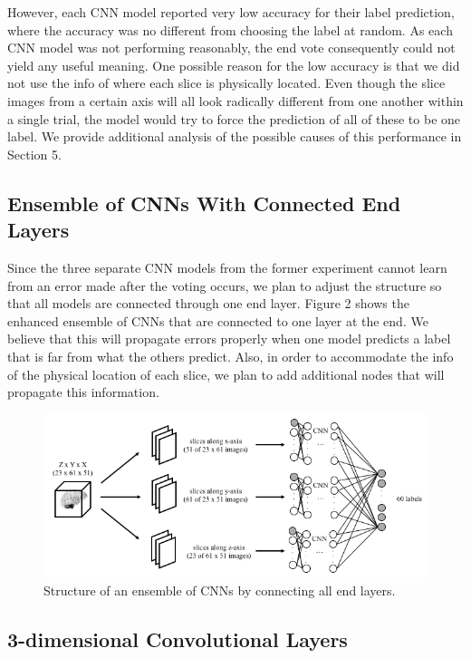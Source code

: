 \documentclass{article} %
\begin{document}
However, each CNN model reported very low accuracy for their label prediction, where the accuracy was no different from choosing the label at random. As each CNN model was not performing reasonably, the end vote consequently could not yield any useful meaning. One possible reason for the low accuracy is that we did not use the info of where each slice is physically located. Even though the slice images from a certain axis will all look radically different from one another within a single trial, the model would try to force the prediction of all of these to be one label. We provide additional analysis of the possible causes of this performance in Section 5.

\subsection{Ensemble of CNNs With Connected End Layers}

Since the three separate CNN models from the former experiment cannot learn from an error made after the voting occurs, we plan to adjust the structure so that all models are connected through one end layer. Figure 2 shows the enhanced ensemble of CNNs that are connected to one layer at the end. We believe that this will propagate errors properly when one model predicts a label that is far from what the others predict. Also, in order to accommodate the info of the physical location of each slice, we plan to add additional nodes that will propagate this information.

\begin{figure}[h]
	\centering
	\includegraphics[height=0.26\textheight]{./img/cnn_proto_b.png}
	\caption{Structure of an ensemble of CNNs by connecting all end layers.}
\end{figure}

\subsection{3-dimensional Convolutional Layers}
\end{document}
